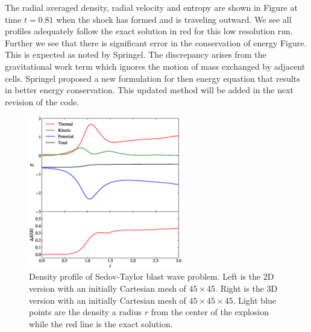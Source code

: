 The radial averaged density, radial velocity and entropy are shown in Figure at time $t=0.81$
when the shock has formed and is traveling outward. We see all profiles adequately follow the
exact solution in red for this low resolution run. Further we see that there is significant
error in the conservation of energy Figure. This is expected as noted by Springel. The 
discrepancy arises from the gravitational work term which ignores the motion of mass
exchanged by adjacent cells. Springel proposed a new formulation for then energy equation
that results in better energy conservation. This updated method will be added in the next
revision of the code.
\begin{figure}
    \begin{center}
        \includegraphics[width=0.6\textwidth]{figures/evrard_energy.eps}
        \caption{Density profile of Sedov-Taylor blast wave problem. Left is the 2D version with an initially
        Cartesian mesh of $45 \times 45$. Right is the 3D version with an initially Cartesian mesh of 
        $45 \times 45 \times 45$. Light blue points are the density a radius $r$ from the center of the explosion
        while the red line is the exact solution.}
        \label{fig.evrard_energy}
    \end{center}
\end{figure}
